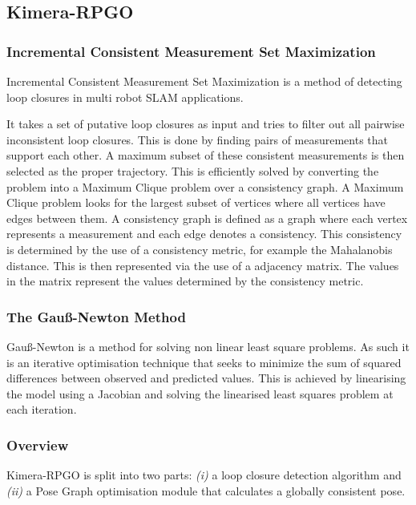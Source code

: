 \documentclass[11pt,a4paper]{article}
\begin{document}
\subsection{Kimera-RPGO}

\subsubsection{Incremental Consistent Measurement Set Maximization} \label{pre:PCM}
Incremental Consistent Measurement Set Maximization is a  method of detecting loop closures in multi robot SLAM applications. 

It takes a set of putative loop closures as input and tries to filter out all pairwise inconsistent loop closures. 
This is done by finding pairs of measurements that support each other. 
A maximum subset of these consistent measurements is then selected as the proper trajectory.
This is efficiently solved by converting the problem into a Maximum Clique problem over a consistency graph. 
A Maximum Clique problem looks for the largest subset of vertices where all vertices have edges between them. 
A consistency graph is defined as a graph where each vertex represents a measurement and each edge denotes a consistency.
This consistency is determined by the use of a consistency metric, for example the Mahalanobis distance.
This is then represented via the use of a adjacency matrix.
The values in the matrix represent the values determined by the consistency metric. 
\subsubsection{The Gauß-Newton Method} \label{pre:Gauß-netwon}
Gauß-Newton is a method for solving non linear least square problems. 
As such it is an iterative optimisation technique that seeks to minimize the sum of squared differences between observed and predicted values.
This is achieved by linearising the model using a Jacobian and solving the linearised least squares problem at each iteration.
\subsubsection {Overview}
Kimera-RPGO is split into two parts: \textit{(i)} a loop closure detection algorithm and \textit{(ii)} a Pose Graph optimisation module that calculates a globally consistent pose.
\end{document}
